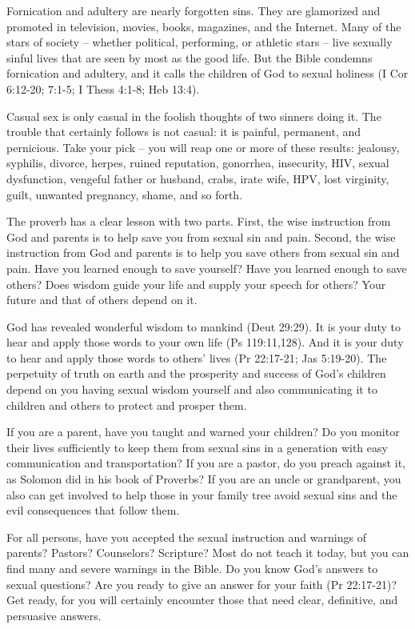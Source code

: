 Fornication and adultery are nearly forgotten sins. They are glamorized and promoted in television, movies, books, magazines, and the Internet. Many of the stars of society – whether political, performing, or athletic stars – live sexually sinful lives that are seen by most as the good life. But the Bible condemns fornication and adultery, and it calls the children of God to sexual holiness (I Cor 6:12-20; 7:1-5; I Thess 4:1-8; Heb 13:4).

Casual sex is only casual in the foolish thoughts of two sinners doing it. The trouble that certainly follows is not casual: it is painful, permanent, and pernicious. Take your pick – you will reap one or more of these results: jealousy, syphilis, divorce, herpes, ruined reputation, gonorrhea, insecurity, HIV, sexual dysfunction, vengeful father or husband, crabs, irate wife, HPV, lost virginity, guilt, unwanted pregnancy, shame, and so forth.

The proverb has a clear lesson with two parts. First, the wise instruction from God and parents is to help save you from sexual sin and pain. Second, the wise instruction from God and parents is to help you save others from sexual sin and pain. Have you learned enough to save yourself? Have you learned enough to save others? Does wisdom guide your life and supply your speech for others? Your future and that of others depend on it.

God has revealed wonderful wisdom to mankind (Deut 29:29). It is your duty to hear and apply those words to your own life (Ps 119:11,128). And it is your duty to hear and apply those words to others’ lives (Pr 22:17-21; Jas 5:19-20). The perpetuity of truth on earth and the prosperity and success of God’s children depend on you having sexual wisdom yourself and also communicating it to children and others to protect and prosper them.

If you are a parent, have you taught and warned your children? Do you monitor their lives sufficiently to keep them from sexual sins in a generation with easy communication and transportation? If you are a pastor, do you preach against it, as Solomon did in his book of Proverbs? If you are an uncle or grandparent, you also can get involved to help those in your family tree avoid sexual sins and the evil consequences that follow them.

For all persons, have you accepted the sexual instruction and warnings of parents? Pastors? Counselors? Scripture? Most do not teach it today, but you can find many and severe warnings in the Bible. Do you know God’s answers to sexual questions? Are you ready to give an answer for your faith (Pr 22:17-21)? Get ready, for you will certainly encounter those that need clear, definitive, and persuasive answers.

